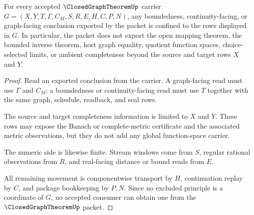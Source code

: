 \begin{theorem}
\label{thm:closed-graph-theorem-nonescape-boundary}
For every accepted $\ClosedGraphTheoremUp$ carrier $G=(X,Y,T,\Gamma,C_M,S,R,E,H,C,P,N)$, any boundedness, continuity-facing, or graph-facing conclusion exported by the packet is confined to the rows displayed in $G$. In particular, the packet does not export the open mapping theorem, the bounded inverse theorem, host graph equality, quotient function spaces, choice-selected limits, or ambient completeness beyond the source and target rows $X$ and $Y$.
\end{theorem}
\begin{proof}
Read an exported conclusion from the carrier. A graph-facing read must use $\Gamma$ and $C_M$; a boundedness or continuity-facing read must use $T$ together with the same graph, schedule, readback, and seal rows.

The source and target completeness information is limited to $X$ and $Y$. These rows may expose the Banach or complete-metric certificate and the associated metric observations, but they do not add any global function-space carrier.

The numeric side is likewise finite. Stream windows come from $S$, regular rational observations from $R$, and real-facing distance or bound reads from $E$.

All remaining movement is componentwise transport by $H$, continuation replay by $C$, and package bookkeeping by $P,N$. Since no excluded principle is a coordinate of $G$, no accepted consumer can obtain one from the $\ClosedGraphTheoremUp$ packet.
\end{proof}

\begin{closurestatus}{\ClosedGraphTheoremUp}
  \theoryclosure{\seedClosure}
  \formalstatus{\unformalizedV}
\end{closurestatus}
